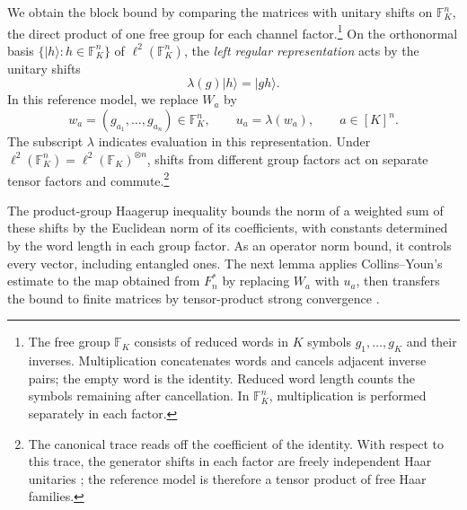 \documentclass[11pt]{article}
\numberwithin{equation}{section}
\theoremstyle{boldremark}\newtheorem{remark}[theorem]{Remark}
\newcommand{\F}{\mathbb F}
\newcommand{\ket}[1]{\lvert #1\rangle}
\begin{document}
We obtain the block bound by comparing the matrices with unitary
shifts on $\F_K^n$, the direct product of one free
group for each channel factor.\footnote{The free group $\F_K$ consists of
reduced words in $K$ symbols $g_1,\ldots,g_K$ and their inverses.
Multiplication concatenates words and cancels adjacent inverse pairs;
the empty word is the identity. Reduced word length counts the symbols
remaining after cancellation. In $\F_K^n$, multiplication is performed
separately in each factor.}
On the orthonormal basis $\{\ket h:h\in\F_K^n\}$ of
$\ell^2(\F_K^n)$, the \emph{left regular representation}
acts by the unitary shifts
\[
 \lambda(g)\ket h=\ket{gh}.
\]
In this reference model, we replace $W_a$ by
\[
 w_a=(g_{a_1},\ldots,g_{a_n})\in\F_K^n,
 \qquad u_a=\lambda(w_a),\qquad a\in[K]^n.
\]
The subscript $\lambda$ indicates evaluation in this representation.
Under $\ell^2(\F_K^n)=\ell^2(\F_K)^{\otimes n}$, shifts from
different group factors act on separate tensor factors and commute.\footnote{The
canonical trace reads off the coefficient of the identity. With respect
to this trace, the generator shifts in each factor are freely independent
Haar unitaries \cite{NicaSpeicher}; the reference model is therefore a
tensor product of free Haar families.}

The product-group Haagerup inequality bounds the norm of a weighted sum
of these shifts by the Euclidean norm of its coefficients, with constants
determined by the word length in each group factor. As an operator norm
bound, it controls every vector, including entangled ones. The next
lemma applies Collins--Youn's estimate \cite[Theorem~3.3]{CY} to the
map obtained from $F_n^*$ by replacing $W_a$ with $u_a$, then
transfers the bound to finite matrices by tensor-product strong
convergence \cite[Theorem~9.2]{BC}.
\end{document}
